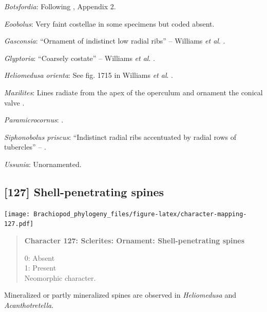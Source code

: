 \documentclass[openany]{book}
\begin{document}
\hypertarget{Botsfordia-coding-126}{}
\emph{Botsfordia}: Following \citet{Williams1998Thediversity}, Appendix
2.

\hypertarget{Eoobolus-coding-126}{}
\emph{Eoobolus}: Very faint costellae in some specimens but coded
absent.

\hypertarget{Gasconsia-coding-126}{}
\emph{Gasconsia}: ``Ornament of indistinct low radial ribs'' -- Williams
\emph{et al}. \citeyearpar[p167]{Williams2000LinguliformeaCraniiformea}.

\hypertarget{Glyptoria-coding-126}{}
\emph{Glyptoria}: ``Coarsely costate'' -- Williams \emph{et al}.
\citeyearpar[p710]{Williams2000LinguliformeaCraniiformea}.

\hypertarget{Heliomedusa_orienta-coding-126}{}
\emph{Heliomedusa orienta}: See fig. 1715 in Williams \emph{et al}.
\citeyearpar{Williams2007Supplement}.

\hypertarget{Maxilites-coding-126}{}
\emph{Maxilites}: Lines radiate from the apex of the operculum
\citep[pl.2 fig. 5]{Marek1972} and ornament the conical valve \citep[pl.
2. fig. 3]{Marek1972}.

\hypertarget{Paramicrocornus-coding-126}{}
\emph{Paramicrocornus}: \citet{Zhang2018Ahyolithid}.

\hypertarget{Siphonobolus_priscus-coding-126}{}
\emph{Siphonobolus priscus}: ``Indistinct radial ribs accentuated by
radial rows of tubercles'' -- \citet{Popov2009Earlyontogeny}.

\hypertarget{Ussunia-coding-126}{}
\emph{Ussunia}: Unornamented.

\subsection*{{[}127{]} Shell-penetrating
spines}\label{shell-penetrating-spines}

\texttt{[image: Brachiopod\_phylogeny\_files/figure-latex/character-mapping-127.pdf]}

\begin{quote}
\textbf{Character 127: Sclerites: Ornament: Shell-penetrating spines}

0: Absent\\
1: Present\\
Neomorphic character.
\end{quote}

Mineralized or partly mineralized spines are observed in
\emph{Heliomedusa} and \emph{Acanthotretella}.
\end{document}
